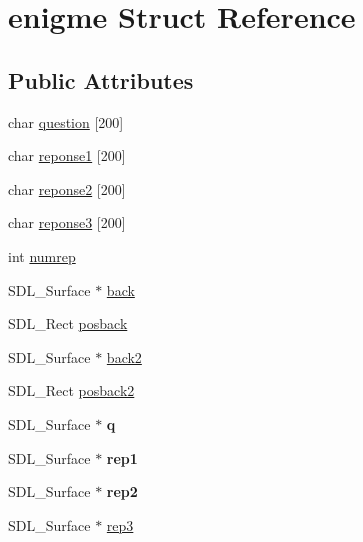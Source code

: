 \hypertarget{structenigme}{}\section{enigme Struct Reference}
\label{structenigme}
\subsection*{Public Attributes}
\begin{DoxyCompactItemize}
\item 
char \hyperlink{structenigme_a13c263b6a2a06090e3b87ca725152ffb}{question} \mbox{[}200\mbox{]}
\item 
char \hyperlink{structenigme_a1d31bead9270c4be04f410820b285ade}{reponse1} \mbox{[}200\mbox{]}
\item 
char \hyperlink{structenigme_a97f9390bd04fc83a0a7a84f3bf03464d}{reponse2} \mbox{[}200\mbox{]}
\item 
char \hyperlink{structenigme_ad7f3c27ab2d1e20502ee3a39040c99f3}{reponse3} \mbox{[}200\mbox{]}
\item 
int \hyperlink{structenigme_aba4da71b70b9a49ba074219597b0412c}{numrep}
\item 
S\+D\+L\+\_\+\+Surface $\ast$ \hyperlink{structenigme_a6a286d6b979d539407e5d14c4638e185}{back}
\item 
S\+D\+L\+\_\+\+Rect \hyperlink{structenigme_acf118c7e77127c316f639b310aa175fb}{posback}
\item 
S\+D\+L\+\_\+\+Surface $\ast$ \hyperlink{structenigme_ae4115f43f989eaddab7c5df8df520c4c}{back2}
\item 
S\+D\+L\+\_\+\+Rect \hyperlink{structenigme_af549ffd67fe7fc9a9632d53b339a3570}{posback2}
\item 
\mbox{\label{structenigme_a45139d48008c7103de10ceb18b0f497c}} 
S\+D\+L\+\_\+\+Surface $\ast$ {\bfseries q}
\item 
\mbox{\label{structenigme_a9ef78c8ecc187c35007fa8c151eae5e8}} 
S\+D\+L\+\_\+\+Surface $\ast$ {\bfseries rep1}
\item 
\mbox{\label{structenigme_a8fc270efddff4d538e25d4ef27712963}} 
S\+D\+L\+\_\+\+Surface $\ast$ {\bfseries rep2}
\item 
S\+D\+L\+\_\+\+Surface $\ast$ \hyperlink{structenigme_ab8a89017f55dc97b6a5708bb1ce08a33}{rep3}
\item 

\end{DoxyCompactItemize}
